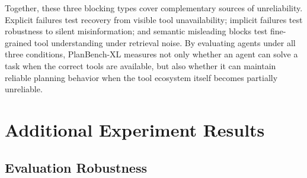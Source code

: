 \documentclass{llmxive}
\providecommand{\bench}[1]{PlanBench-XL}
\begin{document}
Together, these three blocking types cover complementary sources of unreliability. 
Explicit failures test recovery from visible tool unavailability; implicit failures test robustness to silent misinformation; and semantic misleading blocks test fine-grained tool understanding under retrieval noise. 
By evaluating agents under all three conditions, \bench{} measures not only whether an agent can solve a task when the correct tools are available, but also whether it can maintain reliable planning behavior when the tool ecosystem itself becomes partially unreliable.



\section{Additional Experiment Results}
\label{app:additional-experiment-results}

\subsection{Evaluation Robustness}
\label{app:evaluation-robustness}

\end{document}
